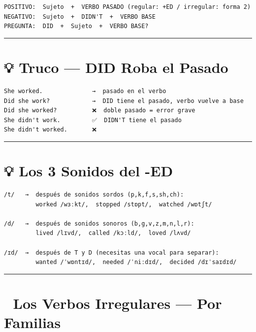 \documentclass[
  spanish,
  letterpaper,
]{scrbook}
\begin{document}
\begin{verbatim}
POSITIVO:  Sujeto  +  VERBO PASADO (regular: +ED / irregular: forma 2)
NEGATIVO:  Sujeto  +  DIDN'T  +  VERBO BASE
PREGUNTA:  DID  +  Sujeto  +  VERBO BASE?
\end{verbatim}

\begin{center}\rule{0.5\linewidth}{0.5pt}\end{center}

\section{💡 Truco --- DID Roba el
Pasado}\label{truco-did-roba-el-pasado}

\begin{verbatim}
She worked.              →  pasado en el verbo
Did she work?            →  DID tiene el pasado, verbo vuelve a base
Did she worked?          ❌  doble pasado = error grave
She didn't work.         ✅  DIDN'T tiene el pasado
She didn't worked.       ❌
\end{verbatim}

\begin{center}\rule{0.5\linewidth}{0.5pt}\end{center}

\section{💡 Los 3 Sonidos del -ED}\label{los-3-sonidos-del--ed}

\begin{verbatim}
/t/   →  después de sonidos sordos (p,k,f,s,sh,ch):
         worked /wɜːkt/,  stopped /stɒpt/,  watched /wɒtʃt/

/d/   →  después de sonidos sonoros (b,g,v,z,m,n,l,r):
         lived /lɪvd/,  called /kɔːld/,  loved /lʌvd/

/ɪd/  →  después de T y D (necesitas una vocal para separar):
         wanted /ˈwɒntɪd/,  needed /ˈniːdɪd/,  decided /dɪˈsaɪdɪd/
\end{verbatim}

\begin{center}\rule{0.5\linewidth}{0.5pt}\end{center}

\section{📐 Los Verbos Irregulares --- Por
Familias}\label{los-verbos-irregulares-por-familias}
\end{document}
